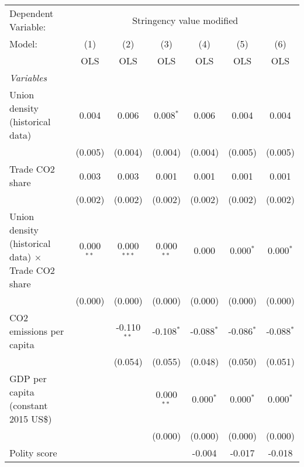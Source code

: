 
\begingroup
\centering
\begin{tabular}{lcccccc}
   \toprule
   Dependent Variable: & \multicolumn{6}{c}{Stringency value modified}\\
   Model:                                                    & (1)          & (2)           & (3)          & (4)          & (5)          & (6)\\  
                                                             &  OLS         & OLS           & OLS          & OLS          & OLS          & OLS\\  
   \midrule
   \emph{Variables}\\
   Union density (historical data)                           & 0.004        & 0.006         & 0.008$^{*}$  & 0.006        & 0.004        & 0.004\\   
                                                             & (0.005)      & (0.004)       & (0.004)      & (0.004)      & (0.005)      & (0.005)\\   
   Trade CO2 share                                           & 0.003        & 0.003         & 0.001        & 0.001        & 0.001        & 0.001\\   
                                                             & (0.002)      & (0.002)       & (0.002)      & (0.002)      & (0.002)      & (0.002)\\   
   Union density (historical data) $\times$ Trade CO2 share  & 0.000$^{**}$ & 0.000$^{***}$ & 0.000$^{**}$ & 0.000        & 0.000$^{*}$  & 0.000$^{*}$\\   
                                                             & (0.000)      & (0.000)       & (0.000)      & (0.000)      & (0.000)      & (0.000)\\   
   CO2 emissions per capita                                  &              & -0.110$^{**}$ & -0.108$^{*}$ & -0.088$^{*}$ & -0.086$^{*}$ & -0.088$^{*}$\\   
                                                             &              & (0.054)       & (0.055)      & (0.048)      & (0.050)      & (0.051)\\   
   GDP per capita (constant 2015 US\$)                       &              &               & 0.000$^{**}$ & 0.000$^{*}$  & 0.000$^{*}$  & 0.000$^{*}$\\   
                                                             &              &               & (0.000)      & (0.000)      & (0.000)      & (0.000)\\   
   Polity score                                              &              &               &              & -0.004       & -0.017       & -0.018\\   

\end{tabular}
